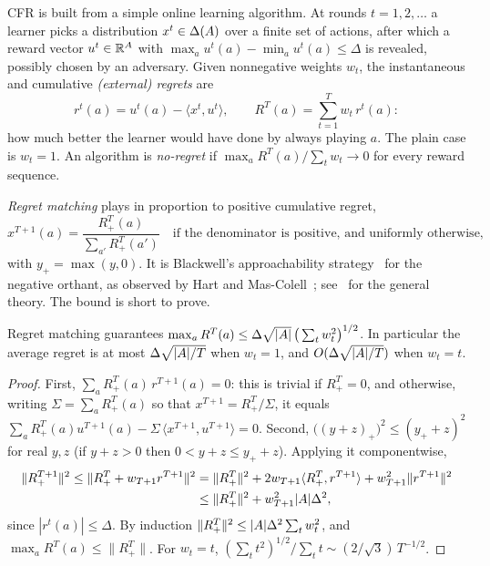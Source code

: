 CFR is built from a simple online learning algorithm. At rounds $t = 1, 2, \dots$ a learner picks a distribution
$x^t \in \Delta(A)$ over a finite set of actions, after which a reward vector $u^t \in \mathbb{R}^{A}$ with
$\max_a u^t(a) - \min_a u^t(a) \le \Delta$ is revealed, possibly chosen by an adversary. Given nonnegative weights
$w_t$, the instantaneous and cumulative \emph{(external) regrets} are
\[
  r^t(a) = u^t(a) - \langle x^t, u^t\rangle, \qquad R^T(a) = \sum_{t=1}^T w_t\, r^t(a):
\]
how much better the learner would have done by always playing $a$. The plain case is $w_t = 1$. An algorithm is
\emph{no-regret} if $\max_a R^T(a) / \sum_t w_t \to 0$ for every reward sequence.

\emph{Regret matching} plays in proportion to positive cumulative regret,
\begin{equation}\label{eq:rm}
  x^{T+1}(a) = \frac{R^T_+(a)}{\sum_{a'} R^T_+(a')} \quad \text{if the denominator is positive, and uniformly otherwise,}
\end{equation}
with $y_+ = \max(y,0)$. It is Blackwell's approachability strategy~\cite{blackwell1956} for the negative orthant, as
observed by Hart and Mas-Colell~\cite{hart2000}; see~\cite{cesabianchi2006} for the general theory. The bound is
short to prove.

\begin{theorem}\label{thm:rm}
Regret matching guarantees $\max_a R^T(a) \le \Delta \sqrt{|A|}\,\big(\sum_{t} w_t^2\big)^{1/2}$. In particular
the average regret is at most $\Delta\sqrt{|A|/T}$ when $w_t = 1$, and $O(\Delta\sqrt{|A|/T})$ when $w_t = t$.
\end{theorem}

\begin{proof}
First, $\sum_a R^T_+(a)\, r^{T+1}(a) = 0$: this is trivial if $R^T_+ = 0$, and otherwise, writing $\Sigma =
\sum_a R^T_+(a)$ so that $x^{T+1} = R^T_+/\Sigma$, it equals $\sum_a R^T_+(a) u^{T+1}(a) - \Sigma\,\langle x^{T+1},
u^{T+1}\rangle = 0$. Second, $\big((y + z)_+\big)^2 \le (y_+ + z)^2$ for real $y, z$ (if $y + z > 0$ then
$0 < y + z \le y_+ + z$). Applying it componentwise,
\begin{align*}
  \lVert R^{T+1}_+ \rVert^2 \le \lVert R^T_+ + w_{T+1} r^{T+1} \rVert^2
  &= \lVert R^T_+\rVert^2 + 2 w_{T+1} \langle R^T_+, r^{T+1} \rangle + w_{T+1}^2 \lVert r^{T+1}\rVert^2 \\
  &\le \lVert R^T_+\rVert^2 + w_{T+1}^2 |A| \Delta^2,
\end{align*}
since $|r^t(a)| \le \Delta$. By induction $\lVert R^T_+\rVert^2 \le |A|\Delta^2 \sum_t w_t^2$, and $\max_a R^T(a)
\le \lVert R^T_+\rVert$. For $w_t = t$, $(\sum_t t^2)^{1/2} / \sum_t t \sim (2/\sqrt3)\,T^{-1/2}$.
\end{proof}

